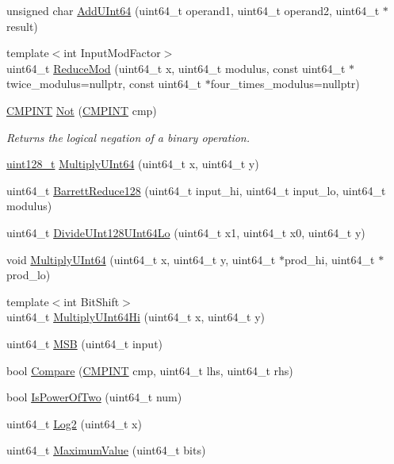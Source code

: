 \begin{DoxyCompactItemize}
\item 
unsigned char \hyperlink{namespacehetest_1_1utils_a04c97740b30cea22b4dff98f4c13dc89}{Add\-U\-Int64} (uint64\-\_\-t operand1, uint64\-\_\-t operand2, uint64\-\_\-t $\ast$result)
\item 
{\footnotesize template$<$int Input\-Mod\-Factor$>$ }\\uint64\-\_\-t \hyperlink{namespacehetest_1_1utils_ae5181e8e294375bba17579f41f44f039}{Reduce\-Mod} (uint64\-\_\-t x, uint64\-\_\-t modulus, const uint64\-\_\-t $\ast$twice\-\_\-modulus=nullptr, const uint64\-\_\-t $\ast$four\-\_\-times\-\_\-modulus=nullptr)
\item 
\hyperlink{namespacehetest_1_1utils_ac7fa0c35a418955522dc45b10864fdc8}{C\-M\-P\-I\-N\-T} \hyperlink{namespacehetest_1_1utils_aab7d7acb16b2a22388513ae84818214c}{Not} (\hyperlink{namespacehetest_1_1utils_ac7fa0c35a418955522dc45b10864fdc8}{C\-M\-P\-I\-N\-T} cmp)
\begin{DoxyCompactList}\small\item\em Returns the logical negation of a binary operation. \end{DoxyCompactList}\item 
\hyperlink{utils-test_8hpp_ab76ef99db23830c7fec1e3019737cab4}{uint128\-\_\-t} \hyperlink{namespacehetest_1_1utils_af38bb2ec0ec65a229877d4a3bdbe787f}{Multiply\-U\-Int64} (uint64\-\_\-t x, uint64\-\_\-t y)
\item 
uint64\-\_\-t \hyperlink{namespacehetest_1_1utils_a842729d820bda62d95f80ebdde202ac6}{Barrett\-Reduce128} (uint64\-\_\-t input\-\_\-hi, uint64\-\_\-t input\-\_\-lo, uint64\-\_\-t modulus)
\item 
uint64\-\_\-t \hyperlink{namespacehetest_1_1utils_a8c18008a708b9e3146f8c5bb95317415}{Divide\-U\-Int128\-U\-Int64\-Lo} (uint64\-\_\-t x1, uint64\-\_\-t x0, uint64\-\_\-t y)
\item 
void \hyperlink{namespacehetest_1_1utils_a8329306e8a458a7ce160ef870e59a9a3}{Multiply\-U\-Int64} (uint64\-\_\-t x, uint64\-\_\-t y, uint64\-\_\-t $\ast$prod\-\_\-hi, uint64\-\_\-t $\ast$prod\-\_\-lo)
\item 
{\footnotesize template$<$int Bit\-Shift$>$ }\\uint64\-\_\-t \hyperlink{namespacehetest_1_1utils_a625cc618050dc0a7fe3fc1720224018b}{Multiply\-U\-Int64\-Hi} (uint64\-\_\-t x, uint64\-\_\-t y)
\item 
uint64\-\_\-t \hyperlink{namespacehetest_1_1utils_a5f70a68d72b65afc296c5d38def31235}{M\-S\-B} (uint64\-\_\-t input)
\item 
bool \hyperlink{namespacehetest_1_1utils_abde8eb855b18fb857dbbd7b06d96fd66}{Compare} (\hyperlink{namespacehetest_1_1utils_ac7fa0c35a418955522dc45b10864fdc8}{C\-M\-P\-I\-N\-T} cmp, uint64\-\_\-t lhs, uint64\-\_\-t rhs)
\item 
bool \hyperlink{namespacehetest_1_1utils_a968364009ecc6add3849c161d7a1088f}{Is\-Power\-Of\-Two} (uint64\-\_\-t num)
\item 
uint64\-\_\-t \hyperlink{namespacehetest_1_1utils_acb4bd5dad64e6c1db0f2b4e1afaa63db}{Log2} (uint64\-\_\-t x)
\item 
uint64\-\_\-t \hyperlink{namespacehetest_1_1utils_a959fdf1d396b9b4f4362486106e7f655}{Maximum\-Value} (uint64\-\_\-t bits)
\end{DoxyCompactItemize}
